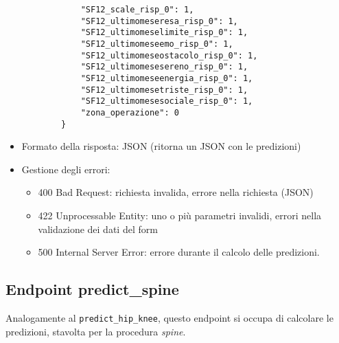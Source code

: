 \begin{itemize}
\begin{verbatim}
            "SF12_scale_risp_0": 1,
            "SF12_ultimomeseresa_risp_0": 1,
            "SF12_ultimomeselimite_risp_0": 1,
            "SF12_ultimomeseemo_risp_0": 1,
            "SF12_ultimomeseostacolo_risp_0": 1,
            "SF12_ultimomesesereno_risp_0": 1,
            "SF12_ultimomeseenergia_risp_0": 1,
            "SF12_ultimomesetriste_risp_0": 1,
            "SF12_ultimomesesociale_risp_0": 1,
            "zona_operazione": 0
        }
    \end{verbatim}
  \item Formato della risposta: JSON (ritorna un JSON con le predizioni)
  \item Gestione degli errori:
      \begin{itemize}
        \item 400 Bad Request: richiesta invalida, errore nella richiesta (JSON)
        \item 422 Unprocessable Entity: uno o più parametri invalidi, errori nella validazione dei dati del form
        \item 500 Internal Server Error: errore durante il calcolo delle predizioni.
    \end{itemize}
\end{itemize}

\subsection{Endpoint predict\_spine}
\label{subsec:predict_spine}

Analogamente al \verb|predict_hip_knee|, questo endpoint si occupa di calcolare le predizioni, stavolta per la procedura \textit{spine}.

